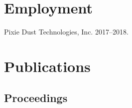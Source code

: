 \documentclass[letterpaper]{article}
\renewenvironment{itemize}{
  \begin{list}{}{
    \setlength{\leftmargin}{1.5em}
  }
}{
  \end{list}
}
\begin{document}
\section*{Employment}

\begin{itemize}
  \item Pixie Dust Technologies, Inc. 2017--2018.
\end{itemize}


\section*{Publications}



\subsection*{Proceedings}
\end{document}
